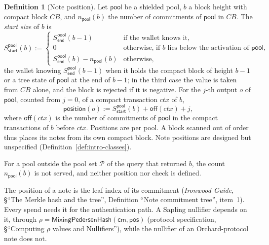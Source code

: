 \documentclass[11pt,a4paper]{article}
\theoremstyle{definition}
\newtheorem{definition}[theorem]{Definition}
\newcommand{\cmsym}{\mathsf{cm}}
\begin{document}
\begin{definition}[Note position]\label{def:compact-position}
Let $\mathsf{pool}$ be a shielded pool, $b$ a block height with compact block
$\mathit{CB}$, and $n_{\mathsf{pool}}(b)$ the number of commitments of
$\mathsf{pool}$ in $\mathit{CB}$. The \emph{start size} of $b$ is
\[
  S^{\mathsf{pool}}_{\mathsf{start}}(b) :=
  \begin{cases}
    S^{\mathsf{pool}}_{\mathsf{end}}(b - 1) & \text{if the wallet knows
      it}, \\
    0 & \text{otherwise, if } b \text{ lies below the activation of }
      \mathsf{pool}, \\
    S^{\mathsf{pool}}_{\mathsf{end}}(b) - n_{\mathsf{pool}}(b) &
      \text{otherwise},
  \end{cases}
\]
the wallet knowing $S^{\mathsf{pool}}_{\mathsf{end}}(b - 1)$ when it holds
the compact block of height $b - 1$ or a tree state of $\mathsf{pool}$ at
the end of $b - 1$; in the third case the value is taken from $\mathit{CB}$
alone, and the block is rejected if it is negative. For the $j$-th output
$o$ of $\mathsf{pool}$, counted from $j = 0$, of a compact transaction
$\mathit{ctx}$ of $b$,
\[
  \mathsf{position}(o) := S^{\mathsf{pool}}_{\mathsf{start}}(b) +
    \mathsf{off}(\mathit{ctx}) + j,
\]
where $\mathsf{off}(\mathit{ctx})$ is the number of commitments of
$\mathsf{pool}$ in the compact transactions of $b$ before $\mathit{ctx}$.
Positions are per pool. A block scanned out of order thus places its notes
from its own compact block. Note positions are designed but unspecified
(Definition~\ref{def:intro-classes}).
\end{definition}

For a pool outside the pool set $\mathcal{P}$ of the query that returned
$b$, the count $n_{\mathsf{pool}}(b)$ is not served, and neither position
nor check is defined.

The position of a note is the leaf index of its commitment (\emph{Ironwood
Guide}, \S``The Merkle hash and the tree'', Definition ``Note commitment tree'',
item~1). Every spend needs it
for the authentication path. A Sapling nullifier depends on it, through
$\rho = \mathsf{MixingPedersenHash}(\cmsym, \mathsf{pos})$ (protocol
specification, \S``Computing $\rho$ values and Nullifiers''), while the
nullifier of an Orchard-protocol note does not.
\end{document}
